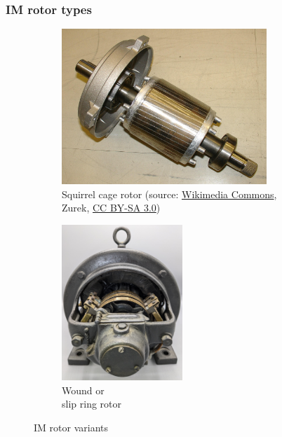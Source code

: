 \begin{frame}
	\frametitle{IM rotor types}
	\begin{figure}
		\centering
		\begin{subfigure}{0.49\textwidth}
			\centering
			\includegraphics[width=0.85\textwidth]{fig/lec06/Squirrel_cage.jpg}
			\caption{Squirrel cage rotor (source: \href{https://commons.wikimedia.org/wiki/File:Wirnik_by_Zureks.jpg}{Wikimedia Commons}, Zurek, \href{https://creativecommons.org/licenses/by-sa/3.0/deed}{CC BY-SA 3.0})}
		\end{subfigure}
		\hfill
		\begin{subfigure}{0.49\textwidth}
			\centering
			\includegraphics[width=0.5\textwidth]{fig/lec06/Slip_ring_IM.jpg}
			\caption{Wound or \\slip ring rotor}
		\end{subfigure}
        \caption{IM rotor variants} 
        \label{fig:examples_IM_rotor}
	\end{figure}
\end{frame}

